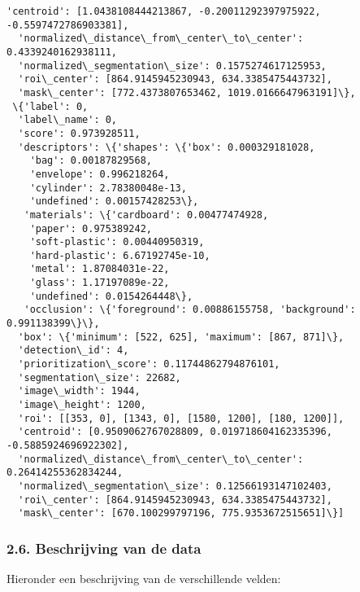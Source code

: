 \documentclass[11pt]{article}
\begin{document}
\begin{tcolorbox}[breakable, size=fbox, boxrule=.5pt, pad at break*=1mm, opacityfill=0]
\begin{Verbatim}[commandchars=\\\{\}]
  'centroid': [1.0438108444213867, -0.20011292397975922, -0.5597472786903381],
  'normalized\_distance\_from\_center\_to\_center': 0.4339240162938111,
  'normalized\_segmentation\_size': 0.1575274617125953,
  'roi\_center': [864.9145945230943, 634.3385475443732],
  'mask\_center': [772.4373807653462, 1019.0166647963191]\},
 \{'label': 0,
  'label\_name': 0,
  'score': 0.973928511,
  'descriptors': \{'shapes': \{'box': 0.000329181028,
    'bag': 0.00187829568,
    'envelope': 0.996218264,
    'cylinder': 2.78380048e-13,
    'undefined': 0.00157428253\},
   'materials': \{'cardboard': 0.00477474928,
    'paper': 0.975389242,
    'soft-plastic': 0.00440950319,
    'hard-plastic': 6.67192745e-10,
    'metal': 1.87084031e-22,
    'glass': 1.17197089e-22,
    'undefined': 0.0154264448\},
   'occlusion': \{'foreground': 0.00886155758, 'background': 0.991138399\}\},
  'box': \{'minimum': [522, 625], 'maximum': [867, 871]\},
  'detection\_id': 4,
  'prioritization\_score': 0.11744862794876101,
  'segmentation\_size': 22682,
  'image\_width': 1944,
  'image\_height': 1200,
  'roi': [[353, 0], [1343, 0], [1580, 1200], [180, 1200]],
  'centroid': [0.9509062767028809, 0.019718604162335396, -0.5885924696922302],
  'normalized\_distance\_from\_center\_to\_center': 0.26414255362834244,
  'normalized\_segmentation\_size': 0.12566193147102403,
  'roi\_center': [864.9145945230943, 634.3385475443732],
  'mask\_center': [670.100299797196, 775.9353672515651]\}]
\end{Verbatim}
\end{tcolorbox}
        
    \subsubsection{2.6. Beschrijving van de
data}\label{beschrijving-van-de-data}

Hieronder een beschrijving van de verschillende velden:
\end{document}
